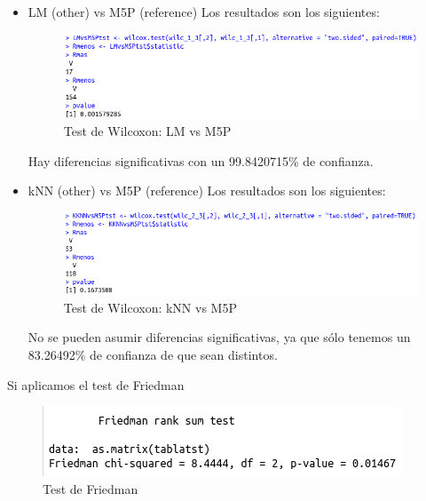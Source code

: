 \begin{itemize}
\begin{itemize}
			\item LM (other) vs M5P (reference)
			Los resultados son los siguientes:
			\begin{figure}[H] %
				\centering
				\includegraphics[scale=0.6]{lmm5p1.png}  %
				\caption{Test de Wilcoxon: LM vs M5P} 
				\label{fig:lmm5p1}
			\end{figure}
		
			Hay diferencias significativas con un 99.8420715\% de confianza.
			
			\item kNN (other) vs M5P (reference)
			Los resultados son los siguientes:
			\begin{figure}[H] %
				\centering
				\includegraphics[scale=0.6]{knnm5p1.png}  %
				\caption{Test de Wilcoxon: kNN vs M5P} 
				\label{fig:knnm5p1}
			\end{figure}
			No se pueden asumir diferencias significativas, ya que sólo tenemos un 83.26492\% de confianza de que sean distintos.
		\end{itemize}
		Si aplicamos el test de Friedman
		
		\begin{figure}[H] %
			\centering
			\includegraphics[scale=0.6]{friedman1.png}  %
			\caption{Test de Friedman} 
			\label{fig:friedman1}
		\end{figure}
		

\end{itemize}
